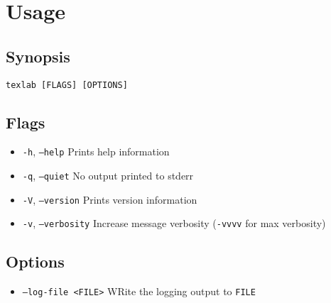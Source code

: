 \documentclass{article}
\begin{document}
\section{Usage}

\subsection{Synopsis}

\texttt{texlab [FLAGS] [OPTIONS]}

\subsection{Flags}

\begin{itemize}
    \item \texttt{-h}, \texttt{--help} Prints help information
    \item \texttt{-q}, \texttt{--quiet} No output printed to stderr
    \item \texttt{-V}, \texttt{--version} Prints version information
    \item \texttt{-v}, \texttt{--verbosity} Increase message verbosity (\texttt{-vvvv} for max verbosity)
\end{itemize}

\subsection{Options}

\begin{itemize}
    \item \texttt{--log-file <FILE>} WRite the logging output to \texttt{FILE}
\end{itemize}
\end{document}
